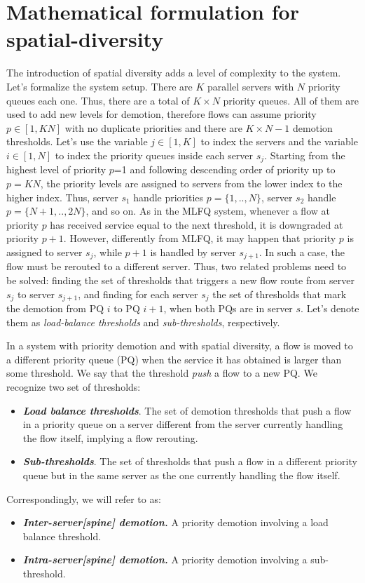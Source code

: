 \section{Mathematical formulation for spatial-diversity}
\label{sec:complete-model}
The introduction of spatial diversity adds a level of complexity to the system. Let's formalize the system setup. There are $K$ parallel servers with $N$ priority queues each one. Thus, there are a total of $K \times N$ priority queues.  All of them are used to add new levels for demotion, therefore flows can assume priority $p \in [1,KN]$ with no duplicate priorities and there are $K \times N - 1$ demotion thresholds. Let's use the variable $j \in [1,K]$ to index the servers and the variable $i \in [1,N]$ to index the priority queues inside each server $s_j$. Starting from the highest level of priority $p$=1 and following descending order of priority up to $p=KN$, the priority levels are assigned to servers from the lower index to the higher index. Thus, server $s_1$ handle priorities $p=\{1,..,N\}$, server $s_2$ handle $p=\{N+1,..,2N\}$, and so on. As in the MLFQ system, whenever a flow at priority $p$ has received service equal to the next threshold, it is downgraded at priority $p+1$. However, differently from MLFQ, it may happen that priority $p$ is assigned to server $s_j$, while $p+1$ is handled by server $s_{j+1}$. In such a case, the flow must be rerouted to a different server. Thus, two related problems need to be solved: finding the set of thresholds that triggers a new flow route from server $s_j$ to server $s_{j+1}$, and finding for each server $s_j$ the set of thresholds that mark the demotion from PQ $i$ to PQ $i+1$, when both PQs are in server $s$. Let's denote them as \emph{load-balance thresholds} and \emph{sub-thresholds}, respectively. 
\smallskip
\begin{tcolorbox}[title=Terminology]
	In a system with priority demotion and with spatial diversity, a flow is moved to a different priority queue (PQ) when the service it has obtained is larger than some threshold. We say that the threshold \textit{push} a flow to a new PQ. We recognize two set of thresholds:
	\begin{itemize}
		\item \textbf{\emph{Load balance thresholds}}. The set of demotion thresholds that push a flow in a priority queue on a server different from the server currently handling the flow itself, implying a flow rerouting.
		\item \textbf{\emph{Sub-thresholds}}. The set of thresholds that push a flow in a different priority queue but in the same server as the one currently handling the flow itself. 
	\end{itemize}
	Correspondingly, we will refer to as:
	\begin{itemize}
		\item \textbf{\emph{Inter-server[spine] demotion.}} A priority demotion involving a load balance threshold.
		\item \textbf{\emph{Intra-server[spine] demotion.}} A priority demotion involving a sub-threshold.
	\end{itemize}
\end{tcolorbox}
